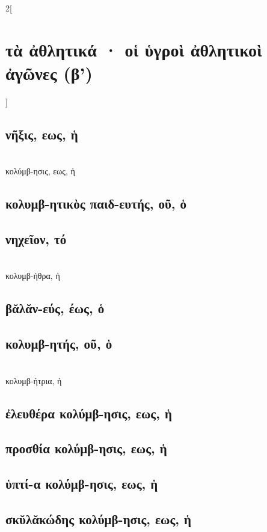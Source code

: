 \documentclass{book}
\begin{document}
\begin{multicols}{2}[\section{τὰ ἀθλητικά · οἱ ὑγροὶ ἀθλητικοὶ ἀγῶνες (β')}]
{\renewcommand \thesubsection {\thesection} }
\subsection{νῆξις, εως, ἡ}
 ~\\
κολύμβ-ησις, εως, ἡ 
\subsection{κολυμβ-ητικὸς παιδ-ευτής, οῦ, ὁ}
\subsection{νηχεῖον, τό}
 ~\\
κολυμβ-ήθρα, ἡ
\subsection{βᾰλᾰν-εύς, έως, ὁ}
\subsection{κολυμβ-ητής, οῦ, ὁ}
 ~\\
κολυμβ-ήτρια, ἡ 
\subsection{ἐλευθέρα κολύμβ-ησις, εως, ἡ}
\subsection{προσθία κολύμβ-ησις, εως, ἡ}
\subsection{ὑπτί-α κολύμβ-ησις, εως, ἡ}
\subsection{σκῠλᾰκώδης κολύμβ-ησις, εως, ἡ}

\end{multicols}
\end{document}
